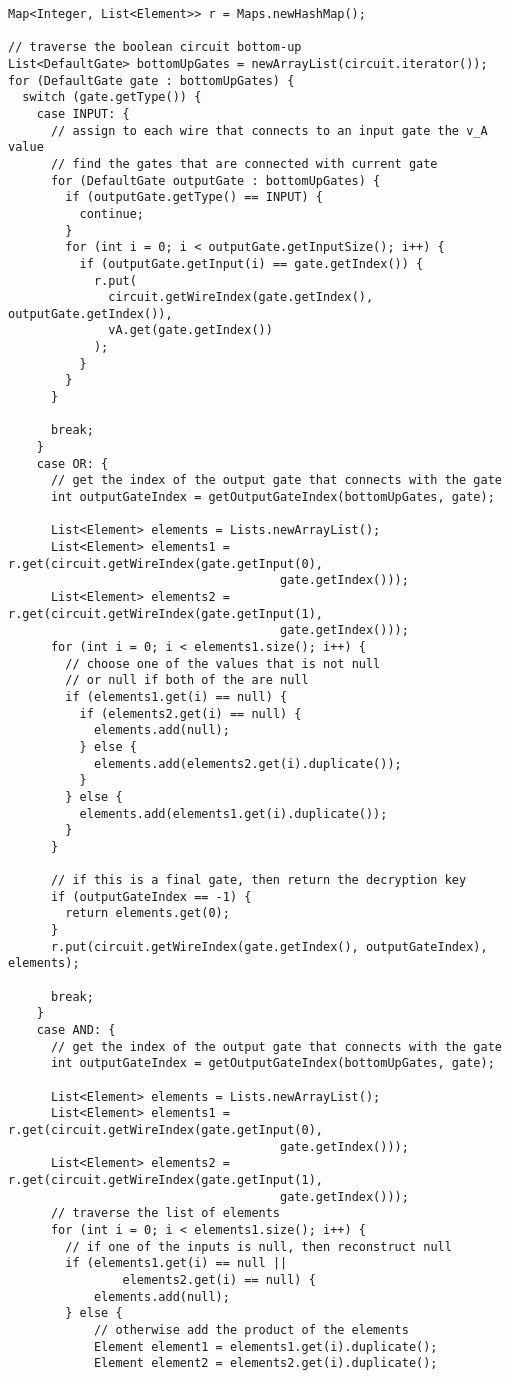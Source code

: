 \documentclass[12pt]{article}
\begin{document}
\begin{lstlisting}
Map<Integer, List<Element>> r = Maps.newHashMap();

// traverse the boolean circuit bottom-up
List<DefaultGate> bottomUpGates = newArrayList(circuit.iterator());
for (DefaultGate gate : bottomUpGates) {
  switch (gate.getType()) {
    case INPUT: {
      // assign to each wire that connects to an input gate the v_A value
      // find the gates that are connected with current gate
      for (DefaultGate outputGate : bottomUpGates) {
        if (outputGate.getType() == INPUT) {
          continue;
        }
        for (int i = 0; i < outputGate.getInputSize(); i++) {
          if (outputGate.getInput(i) == gate.getIndex()) {
            r.put(
              circuit.getWireIndex(gate.getIndex(), outputGate.getIndex()), 
              vA.get(gate.getIndex())
            );
          }
        }
      }

      break;
    }
    case OR: {
      // get the index of the output gate that connects with the gate
      int outputGateIndex = getOutputGateIndex(bottomUpGates, gate);

      List<Element> elements = Lists.newArrayList();
      List<Element> elements1 = r.get(circuit.getWireIndex(gate.getInput(0), 
                                      gate.getIndex()));
      List<Element> elements2 = r.get(circuit.getWireIndex(gate.getInput(1), 
                                      gate.getIndex()));
      for (int i = 0; i < elements1.size(); i++) {
        // choose one of the values that is not null 
        // or null if both of the are null
        if (elements1.get(i) == null) {
          if (elements2.get(i) == null) {
            elements.add(null);
          } else {
            elements.add(elements2.get(i).duplicate());
          }
        } else {
          elements.add(elements1.get(i).duplicate());
        }
      }

      // if this is a final gate, then return the decryption key
      if (outputGateIndex == -1) {
        return elements.get(0);
      }
      r.put(circuit.getWireIndex(gate.getIndex(), outputGateIndex), elements);

      break;
    }
    case AND: {
      // get the index of the output gate that connects with the gate
      int outputGateIndex = getOutputGateIndex(bottomUpGates, gate);
        
      List<Element> elements = Lists.newArrayList();
      List<Element> elements1 = r.get(circuit.getWireIndex(gate.getInput(0), 
                                      gate.getIndex()));
      List<Element> elements2 = r.get(circuit.getWireIndex(gate.getInput(1), 
                                      gate.getIndex()));
      // traverse the list of elements
      for (int i = 0; i < elements1.size(); i++) {
        // if one of the inputs is null, then reconstruct null
        if (elements1.get(i) == null ||
                elements2.get(i) == null) {
            elements.add(null);
        } else {
            // otherwise add the product of the elements
            Element element1 = elements1.get(i).duplicate();
            Element element2 = elements2.get(i).duplicate();
    

\end{lstlisting}
\end{document}
